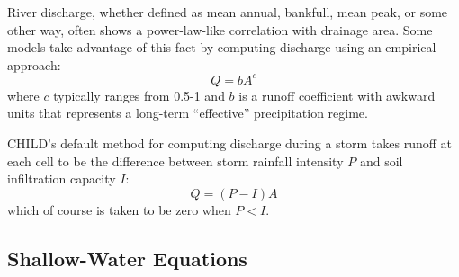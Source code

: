 \documentclass[12pt,reqno]{amsart}
\begin{document}
River discharge, whether defined as mean annual, bankfull, mean peak, or some other way, often shows a power-law-like correlation with drainage area. Some models take advantage of this fact by computing discharge using an empirical approach:
\begin{equation}
Q = b A^c
\end{equation}
where $c$ typically ranges from 0.5-1 and $b$ is a runoff coefficient with awkward units that represents a long-term ``effective'' precipitation regime.

CHILD's default method for computing discharge during a storm takes runoff at each cell to be the difference between storm rainfall intensity $P$ and soil infiltration capacity $I$:
\begin{equation}
Q = (P-I) A
\end{equation}
which of course is taken to be zero when $P<I$.

\subsection{Shallow-Water Equations}
\end{document}
